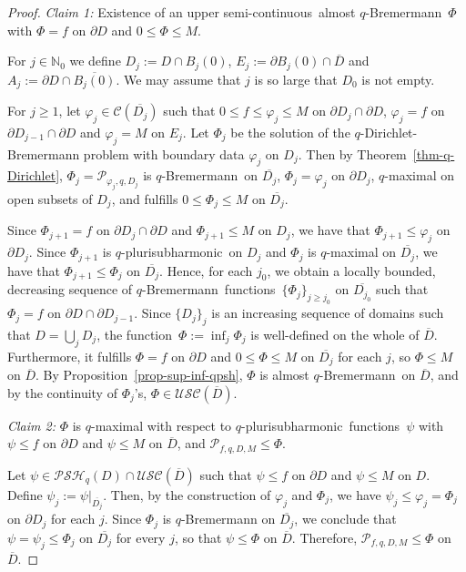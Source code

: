 \documentclass[10pt,a4paper]{amsart}
\numberwithin{equation}{section}
\newcommand{\nbb}{\mathbb{N}}
\newcommand{\ccal}{\mathcal{C}}
\newcommand{\pcal}{\mathcal{P}}
\newcommand{\USC}{\mathcal{USC}}
\newcommand{\qbrem}{$q$-Bremermann}
\newcommand{\qpsh}{$q$-pluri\-sub\-harmonic}
\newcommand{\PSH}{\mathcal{PSH}}
\newcommand{\cl}[1]{\overline{#1}}
\newcommand{\usc}{upper semi-continuous}
\newcommand{\fct}{function}
\newcommand{\fcts}{functions}
\newcommand{\cld}{\overline{D}}
\newcommand{\vphi}{\varphi}
\begin{document}
\begin{proof} 

\textit{Claim 1:} Existence of an \usc\ almost \qbrem\ $\Phi$ with $\Phi=f$ on $\partial D$ and $0 \leq \Phi \leq M$.

\medskip

For $j \in \nbb_0$ we define $D_j:=D\cap B_{j}(0)$,  $E_j:=\partial B_{j}(0)\cap \cld$ and $A_j:=\partial D \cap \cl{B_{j}(0)}$. We may assume that $j$ is so large that $D_0$ is not empty.

For $j \geq 1$, let $\vphi_{j} \in \ccal(\cl{D_j})$ such that $ 0 \leq f \leq \vphi_{j}\leq M$ on $\partial D_j \cap \partial D$, $\vphi_{j}=f$ on $\partial D_{j-1}\cap \partial D$ and $\vphi_j=M$ on $E_j$. Let $\Phi_{j}$ be the solution of the $q$-Dirichlet-Bremermann problem with boundary data $\vphi_{j}$ on $D_j$. Then by Theorem~\ref{thm-q-Dirichlet}, $\Phi_j=\pcal_{\vphi_j,q,D_j}$ is \qbrem\ on $\cl{D_j}$, $\Phi_j=\vphi_j$ on $\partial D_j$, $q$-maximal on open subsets of $D_j$, and fulfills $0 \leq \Phi_j \leq M$ on $\cl{D_j}$. 

Since $\Phi_{j+1}=f$ on $\partial D_j\cap \partial D$ and $\Phi_{j+1} \leq M$ on $D_j$, we have that $\Phi_{j+1} \leq \vphi_{j}$ on $\partial D_j$. Since $\Phi_{j+1}$ is \qpsh\ on $D_j$ and $\Phi_{j}$ is $q$-maximal on $\cl{D_j}$, we have that $\Phi_{j+1} \leq \Phi_{j}$ on $\cl{D_j}$. Hence, for each $j_0$, we obtain a locally bounded, decreasing sequence of \qbrem\ \fcts\ $\{\Phi_j\}_{j\geq j_0}$ on $\cl{D_{j_0}}$ such that $\Phi_j=f$ on $\partial D \cap \partial D_{j-1}$. Since $\{D_j\}_{j}$ is an increasing sequence of domains such that $D=\bigcup_{j}D_j$, the \fct\ $\Phi:=\inf_j \Phi_j$ is well-defined on the whole of $\cld$. Furthermore, it fulfills $\Phi=f$ on $\partial D$ and $0\leq\Phi \leq M$ on $\cl{D_j}$ for each $j$, so $\Phi \leq M$ on $\cld$. By Proposition~\ref{prop-sup-inf-qpsh}, $\Phi$ is almost \qbrem\ on $\cld$, and by the continuity of $\Phi_j$'s, $\Phi \in \USC(\cld)$.

\medskip

\textit{Claim 2:} $\Phi$ is $q$-maximal with respect to \qpsh\ \fcts\ $\psi$ with $\psi \leq f$ on $\partial D$ and $\psi \leq M$ on $\cld$, and $\pcal_{f,q,D,M} \leq \Phi$.

\medskip

Let $\psi \in \PSH_q(D)\cap\USC(\cld)$ such that $\psi \leq f$ on $\partial D$ and $\psi \leq M$ on $D$. Define $\psi_j:=\psi|_{\cl{D_j}}$. Then, by the construction of $\vphi_j$ and $\Phi_j$, we have $\psi_j\leq \vphi_j=\Phi_j$ on $\partial D_j$ for each $j$. Since $\Phi_j$ is $q$-Bremermann on $\cl{D_j}$, we conclude that $\psi=\psi_j \leq \Phi_j$ on $\cl{D_j}$ for every $j$, so that $\psi \leq \Phi$ on $\cl{D}$. Therefore, $\pcal_{f,q,D,M} \leq \Phi$ on~$\cld$.




\end{proof}
\end{document}
